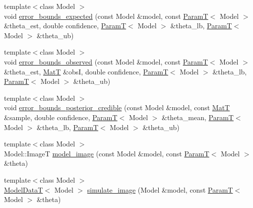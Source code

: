 \begin{DoxyCompactItemize}
\item 
{\footnotesize template$<$class Model $>$ }\\void \hyperlink{namespacemappel_1_1methods_a40f38c9be75ed5bbcc4066a289894ea1}{error\+\_\+bounds\+\_\+expected} (const Model \&model, const \hyperlink{namespacemappel_a667925cb0d6c0e49f2f035cc5a9a6857}{ParamT}$<$ Model $>$ \&theta\+\_\+est, double confidence, \hyperlink{namespacemappel_a667925cb0d6c0e49f2f035cc5a9a6857}{ParamT}$<$ Model $>$ \&theta\+\_\+lb, \hyperlink{namespacemappel_a667925cb0d6c0e49f2f035cc5a9a6857}{ParamT}$<$ Model $>$ \&theta\+\_\+ub)
\item 
{\footnotesize template$<$class Model $>$ }\\void \hyperlink{namespacemappel_1_1methods_afa9582bf7c7354506ba4976a70172ba7}{error\+\_\+bounds\+\_\+observed} (const Model \&model, const \hyperlink{namespacemappel_a667925cb0d6c0e49f2f035cc5a9a6857}{ParamT}$<$ Model $>$ \&theta\+\_\+est, \hyperlink{namespacemappel_a7091ab87c528041f7e2027195fad8915}{MatT} \&obsI, double confidence, \hyperlink{namespacemappel_a667925cb0d6c0e49f2f035cc5a9a6857}{ParamT}$<$ Model $>$ \&theta\+\_\+lb, \hyperlink{namespacemappel_a667925cb0d6c0e49f2f035cc5a9a6857}{ParamT}$<$ Model $>$ \&theta\+\_\+ub)
\item 
{\footnotesize template$<$class Model $>$ }\\void \hyperlink{namespacemappel_1_1methods_a18420d9682150122165a2dfdf43c273a}{error\+\_\+bounds\+\_\+posterior\+\_\+credible} (const Model \&model, const \hyperlink{namespacemappel_a7091ab87c528041f7e2027195fad8915}{MatT} \&sample, double confidence, \hyperlink{namespacemappel_a667925cb0d6c0e49f2f035cc5a9a6857}{ParamT}$<$ Model $>$ \&theta\+\_\+mean, \hyperlink{namespacemappel_a667925cb0d6c0e49f2f035cc5a9a6857}{ParamT}$<$ Model $>$ \&theta\+\_\+lb, \hyperlink{namespacemappel_a667925cb0d6c0e49f2f035cc5a9a6857}{ParamT}$<$ Model $>$ \&theta\+\_\+ub)
\item 
{\footnotesize template$<$class Model $>$ }\\Model\+::\+ImageT \hyperlink{namespacemappel_1_1methods_ab7601760f76a0f3d283aaa1b21d4f5b5}{model\+\_\+image} (const Model \&model, const \hyperlink{namespacemappel_a667925cb0d6c0e49f2f035cc5a9a6857}{ParamT}$<$ Model $>$ \&theta)
\item 
{\footnotesize template$<$class Model $>$ }\\\hyperlink{namespacemappel_a97f050df953605381ae9c901c3b125f1}{Model\+DataT}$<$ Model $>$ \hyperlink{namespacemappel_1_1methods_a3809077f8bb3dca1fdf43ccc67dde62d}{simulate\+\_\+image} (Model \&model, const \hyperlink{namespacemappel_a667925cb0d6c0e49f2f035cc5a9a6857}{ParamT}$<$ Model $>$ \&theta)

\end{DoxyCompactItemize}
